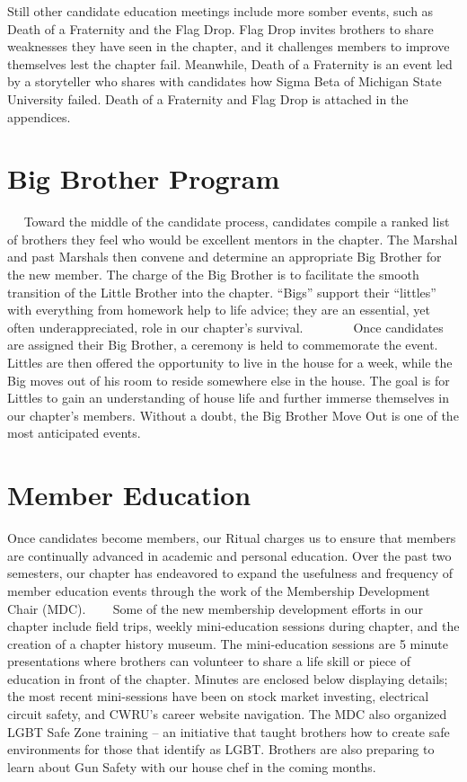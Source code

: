    Still other candidate education meetings include more somber events, such as Death of a Fraternity and the Flag Drop. Flag Drop invites brothers to share weaknesses they have seen in the chapter, and it challenges members to improve themselves lest the chapter fail. Meanwhile, Death of a Fraternity is an event led by a storyteller who shares with candidates how Sigma Beta of Michigan State University failed. Death of a Fraternity and Flag Drop is attached in the appendices.
  
  \section*{Big Brother Program}
  
    Toward the middle of the candidate process, candidates compile a ranked list of brothers they feel who would be excellent mentors in the chapter. The Marshal and past Marshals then convene and determine an appropriate Big Brother for the new member. The charge of the Big Brother is to facilitate the smooth transition of the Little Brother into the chapter. ``Bigs'' support their ``littles'' with everything from homework help to life advice; they are an essential, yet often underappreciated, role in our chapter’s survival. 
    
    Once candidates are assigned their Big Brother, a ceremony is held to commemorate the event. Littles are then offered the opportunity to live in the house for a week, while the Big moves out of his room to reside somewhere else in the house. The goal is for Littles to gain an understanding of house life and further immerse themselves in our chapter’s members. Without a doubt, the Big Brother Move Out is one of the most anticipated events. 
    
   \section*{Member Education}
      Once candidates become members, our Ritual charges us to ensure that members are continually advanced in academic and personal education. Over the past two semesters, our chapter has endeavored to expand the usefulness and frequency of member education events through the work of the Membership Development Chair (MDC). 
    
      Some of the new membership development efforts in our chapter include field trips, weekly mini-education sessions during chapter, and the creation of a chapter history museum. The mini-education sessions are 5 minute presentations where brothers can volunteer to share a life skill or piece of education in front of the chapter. Minutes are enclosed below displaying details; the most recent mini-sessions have been on stock market investing, electrical circuit safety, and CWRU's career website navigation. The MDC also organized LGBT Safe Zone training – an initiative that taught brothers how to create safe environments for those that identify as LGBT. Brothers are also preparing to learn about Gun Safety with our house chef in the coming months. 
